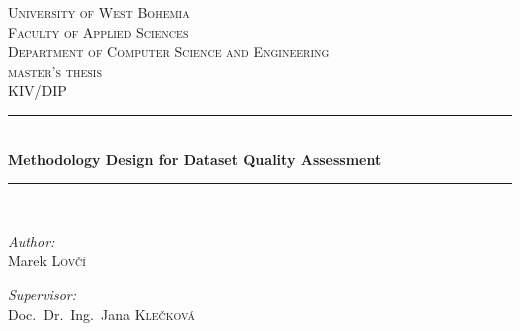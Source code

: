\linespread{1}

\begin{titlepage}

    \newcommand{\HRule}{\rule{\linewidth}{0.5mm}} %

    \center{} %


    \textsc{\LARGE University of West Bohemia}\\[.5cm] %
    \textsc{\Large Faculty of Applied Sciences}\\[.5cm] %
    \textsc{\Large Department of Computer Science and Engineering}\\[1.5cm] %

    \textsc{\Large master's thesis}\\[0.5cm] %
    \textsc{\large KIV/DIP}\\[0.5cm] %


    \HRule{} \\[0.4cm]
    {\huge \bfseries Methodology Design for Dataset Quality Assessment}\\ %
    \HRule{} \\[1.5cm]


    \begin{minipage}[t]{0.4\textwidth}
        \begin{flushleft}
            \large \emph{Author:}\\
            Marek \textsc{Lovčí}
        \end{flushleft}
    \end{minipage}
    \begin{minipage}[t]{0.4\textwidth}
        \begin{flushright}
            \large \emph{Supervisor:}\\
            Doc.\ Dr.\ Ing.\ Jana \textsc{Klečková}
        \end{flushright}
    \end{minipage}\\[5.5cm] %


\end{titlepage}
